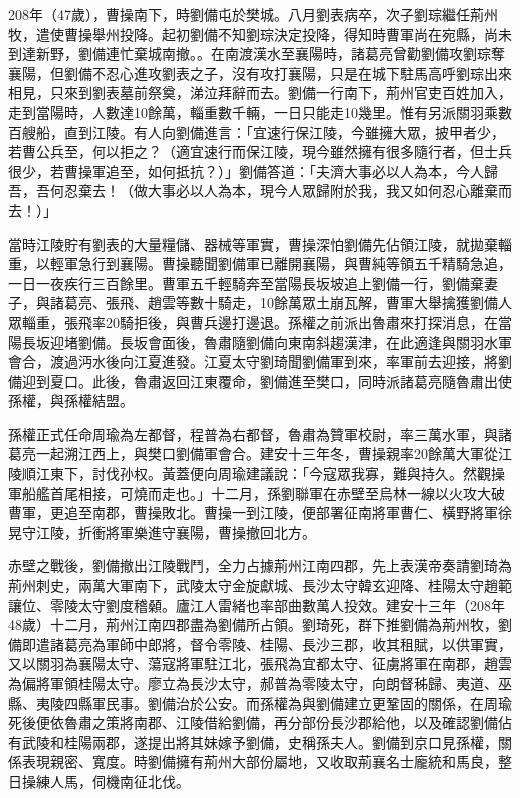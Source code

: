 208年（47歲），曹操南下，時劉備屯於樊城。八月劉表病卒，次子劉琮繼任荊州牧，遣使曹操舉州投降。起初劉備不知劉琮決定投降，得知時曹軍尚在宛縣，尚未到達新野，劉備連忙棄城南撤。。在南渡漢水至襄陽時，諸葛亮曾勸劉備攻劉琮奪襄陽，但劉備不忍心進攻劉表之子，沒有攻打襄陽，只是在城下駐馬高呼劉琮出來相見，只來到劉表墓前祭奠，涕泣拜辭而去。劉備一行南下，荊州官吏百姓加入，走到當陽時，人數達10餘萬，輜重數千輛，一日只能走10幾里。惟有另派關羽乘數百艘船，直到江陵。有人向劉備進言：「宜速行保江陵，今雖擁大眾，披甲者少，若曹公兵至，何以拒之？（適宜速行而保江陵，現今雖然擁有很多隨行者，但士兵很少，若曹操軍追至，如何抵抗？）」劉備答道：「夫濟大事必以人為本，今人歸吾，吾何忍棄去！（做大事必以人為本，現今人眾歸附於我，我又如何忍心離棄而去！）」

當時江陵貯有劉表的大量糧儲、器械等軍實，曹操深怕劉備先佔領江陵，就拋棄輜重，以輕軍急行到襄陽。曹操聽聞劉備軍已離開襄陽，與曹純等領五千精騎急追，一日一夜疾行三百餘里。曹軍五千輕騎奔至當陽長坂坡追上劉備一行，劉備棄妻子，與諸葛亮、張飛、趙雲等數十騎走，10餘萬眾土崩瓦解，曹軍大舉擒獲劉備人眾輜重，張飛率20騎拒後，與曹兵邊打邊退。孫權之前派出魯肅來打探消息，在當陽長坂迎堵劉備。長坂會面後，魯肅隨劉備向東南斜趨漢津，在此適逢與關羽水軍會合，渡過沔水後向江夏進發。江夏太守劉琦聞劉備軍到來，率軍前去迎接，將劉備迎到夏口。此後，魯肅返回江東覆命，劉備進至樊口，同時派諸葛亮隨魯肅出使孫權，與孫權結盟。

孫權正式任命周瑜為左都督，程普為右都督，魯肅為贊軍校尉，率三萬水軍，與諸葛亮一起溯江西上，與樊口劉備軍會合。建安十三年冬，曹操親率20餘萬大軍從江陵順江東下，討伐孙权。黃蓋便向周瑜建議說：「今寇眾我寡，難與持久。然觀操軍船艦首尾相接，可燒而走也。」十二月，孫劉聯軍在赤壁至烏林一線以火攻大破曹軍，更追至南郡，曹操敗北。曹操一到江陵，便部署征南將軍曹仁、橫野將軍徐晃守江陵，折衝將軍樂進守襄陽，曹操撤回北方。

赤壁之戰後，劉備撤出江陵戰鬥，全力占據荊州江南四郡，先上表漢帝奏請劉琦為荊州刺史，兩萬大軍南下，武陵太守金旋獻城、長沙太守韓玄迎降、桂陽太守趙範讓位、零陵太守劉度稽顙。廬江人雷緒也率部曲數萬人投效。建安十三年（208年48歲）十二月，荊州江南四郡盡為劉備所占領。劉琦死，群下推劉備為荊州牧，劉備即遣諸葛亮為軍師中郎將，督令零陵、桂陽、長沙三郡，收其租賦，以供軍實，又以關羽為襄陽太守、蕩寇將軍駐江北，張飛為宜都太守、征虜將軍在南郡，趙雲為偏將軍領桂陽太守。廖立為長沙太守，郝普為零陵太守，向朗督秭歸、夷道、巫縣、夷陵四縣軍民事。劉備治於公安。而孫權為與劉備建立更鞏固的關係，在周瑜死後便依魯肅之策將南郡、江陵借給劉備，再分部份長沙郡給他，以及確認劉備佔有武陵和桂陽兩郡，遂提出將其妹嫁予劉備，史稱孫夫人。劉備到京口見孫權，關係表現親密、寬度。時劉備擁有荊州大部份屬地，又收取荊襄名士龐統和馬良，整日操練人馬，伺機南征北伐。

